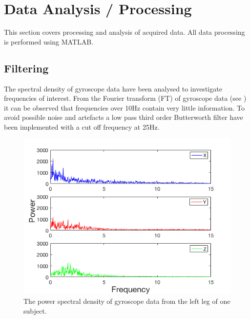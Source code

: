 \section{Data Analysis / Processing}
This section covers processing and analysis of acquired data. All data processing is performed using MATLAB. 

\subsection{Filtering} \label{subsec:filtering}
The spectral density of gyroscope data have been analysed to investigate frequencies of interest. From the Fourier transform (FT) of gyroscope data (see ) it can be observed that frequencies over 10Hz contain very little information. To avoid possible noise and artefacts a low pass third order Butterworth filter have been implemented with a cut off frequency at 25Hz. %

\begin{figure}[H]
	\includegraphics[width=.6\textwidth]{figures/gyroFFTPlot}
	\caption{The power spectral density of gyroscope data from the left leg of one subject.}
	\label{fig:gyroFFTPlot}  %
\end{figure}



